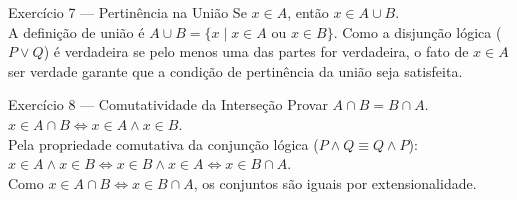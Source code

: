 \documentclass[12pt]{article}
\begin{document}
\begin{block}{Exercício 7 — Pertinência na União}
Se $x \in A$, então $x \in A \cup B$. \\
A definição de união é $A \cup B = \{x \mid x \in A \text{ ou } x \in B\}$. Como a disjunção lógica ($P \lor Q$) é verdadeira se pelo menos uma das partes for verdadeira, o fato de $x \in A$ ser verdade garante que a condição de pertinência da união seja satisfeita.
\end{block}

\begin{block}{Exercício 8 — Comutatividade da Interseção}
Provar $A \cap B = B \cap A$. \\
$x \in A \cap B \iff x \in A \land x \in B$. \\
Pela propriedade comutativa da conjunção lógica ($P \land Q \equiv Q \land P$): \\
$x \in A \land x \in B \iff x \in B \land x \in A \iff x \in B \cap A$. \\
Como $x \in A \cap B \iff x \in B \cap A$, os conjuntos são iguais por extensionalidade.
\end{block}
\end{document}
